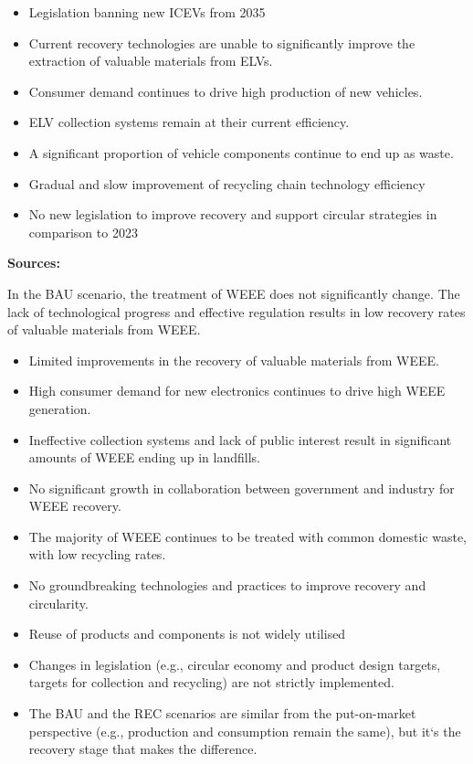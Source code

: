 \begin{itemize}
  \item Legislation banning new ICEVs from 2035
  \item Current recovery technologies are unable to significantly improve the extraction of valuable materials from ELVs.
  \item Consumer demand continues to drive high production of new vehicles.
  \item ELV collection systems remain at their current efficiency.
  \item A significant proportion of vehicle components continue to end up as waste.
  \item Gradual and slow improvement of recycling chain technology efficiency
  \item No new legislation to improve recovery and support circular strategies in comparison to 2023
\end{itemize}



\wasteSubsubsecWEEE
\textbf{Sources:}~\cite{parajuly2019weee,un2023weee,forti2020weee,eu2012weee,eu2012weeerecast, narbonperpina2020weee}

In the BAU scenario, the treatment of WEEE does not significantly change. The lack of technological progress and effective regulation results in low recovery rates of valuable materials from WEEE.

\begin{itemize}
  \item Limited improvements in the recovery of valuable materials from WEEE.
  \item High consumer demand for new electronics continues to drive high WEEE generation.
  \item Ineffective collection systems and lack of public interest result in significant amounts of WEEE ending up in landfills.
  \item No significant growth in collaboration between government and industry for WEEE recovery.
  \item The majority of WEEE continues to be treated with common domestic waste, with low recycling rates.
  \item No groundbreaking technologies and practices to improve recovery and circularity.
  \item Reuse of products and components is not widely utilised
  \item Changes in legislation (e.g., circular economy and product design targets, targets for collection and recycling) are not strictly implemented.
  \item The BAU and the REC scenarios are similar from the put-on-market perspective (e.g., production and consumption remain the same), but it`s the recovery stage that makes the difference.
\end{itemize}



